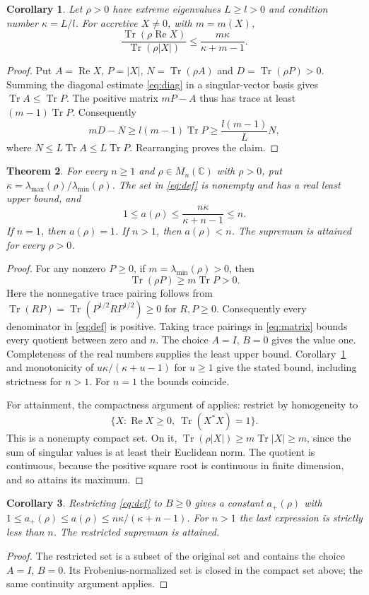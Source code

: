 \documentclass[11pt]{article}
\newcommand{\Tr}{\operatorname{Tr}}
\newcommand{\Ree}{\operatorname{Re}}
\newcommand{\C}{\mathbb C}
\newtheorem{theorem}{Theorem}
\newtheorem{corollary}[theorem]{Corollary}
\begin{document}
\begin{corollary}\label{cor:condition}
Let $\rho>0$ have extreme eigenvalues $L\geq l>0$ and condition
number $\kappa=L/l$. For accretive $X\ne0$, with $m=m(X)$,
\[
\frac{\Tr(\rho\Ree X)}{\Tr(\rho|X|)}
\leq\frac{m\kappa}{\kappa+m-1}.
\]
\end{corollary}
\begin{proof}
Put $A=\Ree X$, $P=|X|$, $N=\Tr(\rho A)$ and $D=\Tr(\rho P)>0$.
Summing the diagonal estimate \eqref{eq:diag} in a singular-vector
basis gives $\Tr A\leq\Tr P$.
The positive matrix $mP-A$ thus has trace at least $(m-1)\Tr P$.
Consequently
\[
mD-N\geq l(m-1)\Tr P\geq \frac{l(m-1)}{L}N,
\]
where $N\leq L\Tr A\leq L\Tr P$. Rearranging proves the claim.
\end{proof}

\begin{theorem}\label{thm:density}
For every $n\geq1$ and $\rho\in M_n(\C)$ with $\rho>0$,
put $\kappa=\lambda_{\max}(\rho)/\lambda_{\min}(\rho)$.
The set in \eqref{eq:def} is nonempty and has a real least upper bound,
and
\[
1\leq a(\rho)\leq\frac{n\kappa}{\kappa+n-1}\leq n.
\]
If $n=1$, then $a(\rho)=1$. If $n>1$, then $a(\rho)<n$.
The supremum is attained for every $\rho>0$.
\end{theorem}
\begin{proof}
For any nonzero $P\geq0$, if $m=\lambda_{\min}(\rho)>0$, then
\[
\Tr(\rho P)\geq m\Tr P>0.
\]
Here the nonnegative trace pairing follows from
$\Tr(RP)=\Tr(P^{1/2}RP^{1/2})\geq0$ for $R,P\geq0$.
Consequently every denominator in \eqref{eq:def} is positive.
Taking trace pairings in \eqref{eq:matrix} bounds every quotient
between zero and $n$. The choice $A=I$, $B=0$ gives the value one.
Completeness of the real numbers supplies the least upper bound.
Corollary~\ref{cor:condition} and monotonicity of
$u\kappa/(\kappa+u-1)$ for $u\geq1$ give the stated bound, including
strictness for $n>1$. For $n=1$ the bounds coincide.

For attainment, the compactness argument of
\cite[Proposition 5.44(b)]{ANN} applies: restrict by homogeneity to
\[
\{X:\Ree X\geq0,\ \Tr(X^*X)=1\}.
\]
This is a nonempty compact set. On it,
$\Tr(\rho|X|)\geq m\Tr|X|\geq m$, since the sum of singular values
is at least their Euclidean norm. The quotient is continuous, because
the positive square root is continuous in finite dimension, and so
attains its maximum.
\end{proof}

\begin{corollary}\label{cor:positive}
Restricting \eqref{eq:def} to $B\geq0$ gives a constant $a_+(\rho)$
with $1\leq a_+(\rho)\leq a(\rho)\leq n\kappa/(\kappa+n-1)$.
For $n>1$ the last expression is strictly less than $n$.
The restricted supremum is attained.
\end{corollary}
\begin{proof}
The restricted set is a subset of the original set and contains
the choice $A=I$, $B=0$. Its Frobenius-normalized set is closed
in the compact set above; the same continuity argument applies.
\end{proof}
\end{document}
